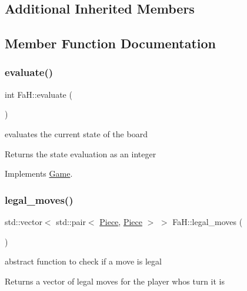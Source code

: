 \subsection*{Additional Inherited Members}


\subsection{Member Function Documentation}
\mbox{\label{class_fa_h_a79788a0309788fed655c77bea2167110}} 
\subsubsection{\texorpdfstring{evaluate()}{evaluate()}}
{\footnotesize\ttfamily int Fa\+H\+::evaluate (\begin{DoxyParamCaption}{ }\end{DoxyParamCaption})\hspace{0.3cm}{\ttfamily [virtual]}}



evaluates the current state of the board 

\begin{DoxyReturn}{Returns}
the state evaluation as an integer 
\end{DoxyReturn}


Implements \hyperlink{class_game_a068b2b3012154457f362c90a80f46253}{Game}.

\mbox{\label{class_fa_h_a6bf4d1735a23a2cf51cfe905c4f437a8}} 
\subsubsection{\texorpdfstring{legal\+\_\+moves()}{legal\_moves()}}
{\footnotesize\ttfamily std\+::vector$<$ std\+::pair$<$ \hyperlink{class_piece}{Piece}, \hyperlink{class_piece}{Piece} $>$ $>$ Fa\+H\+::legal\+\_\+moves (\begin{DoxyParamCaption}{ }\end{DoxyParamCaption})\hspace{0.3cm}{\ttfamily [virtual]}}



abstract function to check if a move is legal 

\begin{DoxyReturn}{Returns}
a vector of legal moves for the player whos turn it is 
\end{DoxyReturn}


